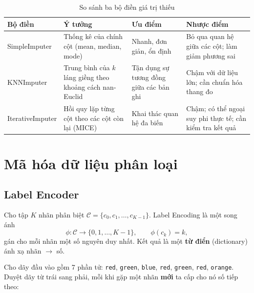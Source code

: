 \begin{table}[H]
\centering
\begin{tabular}{|p{3.1cm}|p{3.7cm}|p{3cm}|p{3.6cm}|}
\hline
\textbf{Bộ điền} & \textbf{Ý tưởng} & \textbf{Ưu điểm} & \textbf{Nhược điểm} \\
\hline
SimpleImputer & Thống kê của chính cột (mean, median, mode) & Nhanh, đơn giản, ổn định & Bỏ qua quan hệ giữa các cột; làm giảm phương sai \\ \hline
KNNImputer & Trung bình của $k$ láng giềng theo khoảng cách nan-Euclid & Tận dụng sự tương đồng giữa các bản ghi & Chậm với dữ liệu lớn; cần chuẩn hóa thang đo \\ \hline
IterativeImputer & Hồi quy lặp từng cột theo các cột còn lại (MICE) & Khai thác quan hệ đa biến & Chậm; có thể ngoại suy phi thực tế; cần kiểm tra kết quả \\ \hline
\end{tabular}
\caption{So sánh ba bộ điền giá trị thiếu}
\label{tab:imputers}
\end{table}

\section{Mã hóa dữ liệu phân loại}

\subsection{Label Encoder}

\begin{definition}
Cho tập $K$ nhãn phân biệt $\mathcal{C} = \{c_0, c_1, \dots, c_{K-1}\}$. Label Encoding là một song ánh
\begin{equation}
    \phi : \mathcal{C} \rightarrow \{0, 1, \dots, K-1\}, \qquad \phi(c_k) = k,
\end{equation}
gán cho mỗi nhãn một số nguyên duy nhất. Kết quả là một \textbf{từ điển} (dictionary) ánh xạ nhãn $\rightarrow$ số.
\end{definition}

\begin{example}
Cho dãy đầu vào gồm 7 phần tử: \texttt{red}, \texttt{green}, \texttt{blue}, \texttt{red}, \texttt{green}, \texttt{red}, \texttt{orange}. Duyệt dãy từ trái sang phải, mỗi khi gặp một nhãn \textbf{mới} ta cấp cho nó số tiếp theo:
\end{example}

